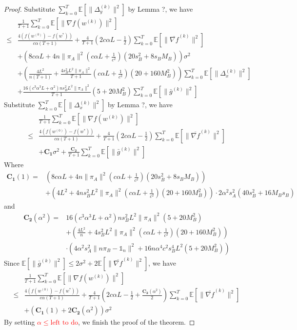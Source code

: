 \documentclass{article}
\newcommand{\EE}[1]{\mathbb{E}\left[#1\right]}
\newcommand{\norm}[1]{\| #1 \|}
\newcommand{\one}{\mathds{1}_n}
\begin{document}
\begin{proof}
  Substitute $\sum_{k=0}^T\EE{\norm{\Delta_{y}^{(k)}}^2}$ by Lemma ?, we have
  \begin{align*}
    &\frac{1}{T+1}\sum_{k=0}^T\EE{\norm{\nabla f(w^{(k)})}^2}\\ 
  \leq & \frac{4(f(w^{(0)})-f(w^{*}))}{c\alpha(T+1)}+\frac{4}{T+1}\left(2c\alpha L-\frac{1}{2}\right)\sum_{k=0}^T\EE{\norm{\overline{\nabla f}^{(k)}}^2}\\&+\left(8c\alpha L+4n\norm{\pi_A}^2(c\alpha L +\frac{1}{c^2})(20s_B^2+8s_BM_B)\right)\sigma^2\\&+\left(\frac{ 4L^2}{n(T+1)}+\frac{4s_B^2L^2\norm{\pi_A}^2}{T+1}(c\alpha L+\frac{1}{c^2})(20+160M_B^2)\right)\sum_{k=0}^T\EE{\norm{\Delta_x^{(k)}}^2}\\&+\frac{16(c^3\alpha^3 L + \alpha^2)n s_B^2 L^2\norm{\pi_A}^2}{T+1}(5+20M_B^2)\sum_{k=0}^T\EE{\norm{\bar{g}^{(k)}}^2}
  \end{align*}
  Substitute $\sum_{k=0}^T\EE{\norm{\Delta_{x}^{(k)}}^2}$ by Lemma ?, we have
  \begin{align*}
    &\frac{1}{T+1}\sum_{k=0}^T\EE{\norm{\nabla f(w^{(k)})}^2}\\ 
  \leq & \frac{4(f(w^{(0)})-f(w^{*}))}{c\alpha(T+1)}+\frac{4}{T+1}\left(2c\alpha L-\frac{1}{2}\right)\sum_{k=0}^T\EE{\norm{\overline{\nabla f}^{(k)}}^2}\\&+\mathbf{C_1}\sigma^2+\frac{\mathbf{C_2}}{T+1}\sum_{k=0}^T\EE{\norm{\bar{g}^{(k)}}^2}
  \end{align*}
  Where 
  \begin{align*}
    \mathbf{C_1}(1)=&\left(8c\alpha L+4n\norm{\pi_A}^2(c\alpha L +\frac{1}{c^2})(20s_B^2+8s_BM_B)\right)\\&+\left(4L^2+4ns_B^2L^2\norm{\pi_A}^2(c\alpha L+\frac{1}{c^2})(20+160M_B^2)\right)\cdot 2\alpha^2s_A^2(40s_B^2+16M_Bs_B)
  \end{align*}
  and
  \begin{align*}
    \mathbf{C_2}(\alpha^2)=&16(c^3\alpha^3 L + \alpha^2)n s_B^2 L^2\norm{\pi_A}^2(5+20M_B^2)\\&+\left(\frac{ 4L^2}{n}+4s_B^2L^2\norm{\pi_A}^2(c\alpha L+\frac{1}{c^2})(20+160M_B^2)\right)\\ &\cdot \left(4\alpha^2s_A^2\norm{n\pi_B-\one}^2+16n\alpha^4c^2s_B^4L^2(5+20M_B^2) \right)
  \end{align*}
  Since $\EE{\norm{\bar{g}^{(k)}}^2}\leq 2\sigma^2+2\EE{\norm{\overline{\nabla f}^{(k)}}^2}$, we have 
  \begin{align*}
    &\frac{1}{T+1}\sum_{k=0}^T\EE{\norm{\nabla f(w^{(k)})}^2}\\ 
  \leq & \frac{4(f(w^{(0)})-f(w^{*}))}{c\alpha(T+1)}+\frac{4}{T+1}\left(2c\alpha L-\frac{1}{2}+\frac{\mathbf{C_2}(\alpha^2)}{2}\right)\sum_{k=0}^T\EE{\norm{\overline{\nabla f}^{(k)}}^2}\\&+\left(\mathbf{C_1}(1)+2\mathbf{C_2}(\alpha^2)\right)\sigma^2
  \end{align*}
  By setting \textcolor{red}{$\alpha \leq \text{left to do}$}, we finish the proof of the theorem.
\end{proof}
\end{document}
